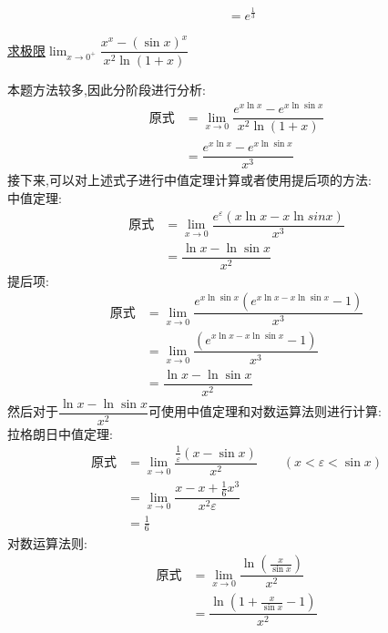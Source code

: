 \documentclass[8pt a4paper, oneside, UTF8]{ctexbook}
\begin{document}
\begin{sloppypar}
\begin{solution}
\begin{align*}
                      & = e^{\frac{1}{3}}
        \end{align*}
    \end{solution}
    \begin{problem}
    \uline{求极限}$\lim_{x\to0^+}\dfrac{x^x-(\sin x)^x}{x^2\ln(1+x)}$
    \end{problem}
    \begin{solution}
        本题方法较多,因此分阶段进行分析:
        \begin{align*}
            \text{原式} & =\lim_{x\to0} \dfrac{e^{x \ln x}-e^{x \ln \sin x} }{x^2\ln(1+x)} \\
                      & = \dfrac{e^{x \ln x}-e^{x \ln \sin x}}{x^3}
        \end{align*}
        接下来,可以对上述式子进行中值定理计算或者使用提后项的方法:\\
        中值定理:
        \begin{align*}
            \text{原式} & =\lim_{x\to0} \dfrac{e^{\varepsilon}(x\ln x- x\ln sin x)}{x^3} \\
                      & =  \dfrac{\ln x -\ln \sin x}{x^2}
        \end{align*}
        提后项:
        \begin{align*}
            \text{原式} & =\lim_{x\to0} \dfrac{e^{x\ln \sin x}(e^{x\ln x-x \ln \sin x}-1)}{x^3} \\
                      & =   \lim_{x\to0} \dfrac{(e^{x\ln x-x \ln \sin x}-1)}{x^3}             \\
                      & =  \dfrac{\ln x -\ln \sin x}{x^2}
        \end{align*}
        然后对于$\dfrac{\ln x -\ln \sin x}{x^2}$可使用中值定理和对数运算法则进行计算:\\
        拉格朗日中值定理:
        \begin{align*}
            \text{原式} & = \lim_{x \to 0}\dfrac{\frac{1}{\varepsilon}(x-\sin x)}{x^2} \qquad(x<\varepsilon < \sin x) \\
                      & =\lim_{x \to 0} \dfrac{x-x+\frac{1}{6}x^3}{x^2 \varepsilon}                                 \\
                      & = \frac{1}{6}
        \end{align*}
        对数运算法则:
        \begin{align*}
            \text{原式} & =\lim_{x \to 0} \dfrac{\ln (\frac{x}{\sin x})}{x^2} \\
                      & =  \dfrac{\ln(1+\frac{x}{\sin x}-1)}{x^2}           \\

\end{align*}
\end{solution}
\end{sloppypar}
\end{document}

